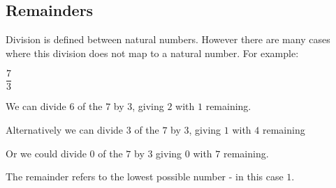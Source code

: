 
\subsection{Remainders}

Division is defined between natural numbers. However there are many cases where this division does not map to a natural number. For example:

\(\dfrac{7}{3}\)

We can divide \(6\) of the \(7\) by \(3\), giving \(2\) with \(1\) remaining.

Alternatively we can divide \(3\) of the \(7\) by \(3\), giving \(1\) with \(4\) remaining

Or we could divide \(0\) of the \(7\) by \(3\) giving \(0\) with \(7\) remaining.

The remainder refers to the lowest possible number - in this case \(1\).

